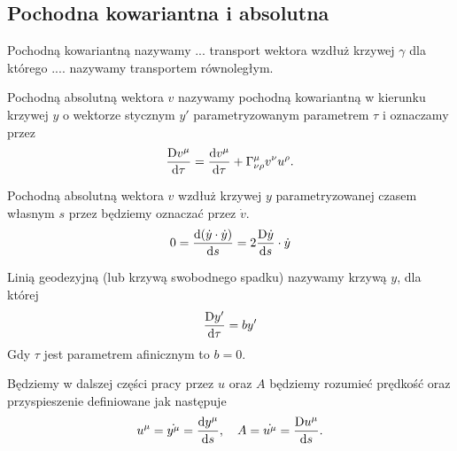 \subsection{Pochodna kowariantna i absolutna}
\begin{definition}
Pochodną kowariantną nazywamy ...
transport wektora wzdłuż krzywej $\gamma$ dla którego 
.... nazywamy transportem równoległym.
\end{definition}
\begin{definition}
Pochodną absolutną wektora $v$ nazywamy pochodną kowariantną w 
kierunku krzywej $y$ o wektorze stycznym $y'$ 
parametryzowanym parametrem $\tau$ i oznaczamy przez
\begin{align}
\frac{\text{D} v^\mu }{\text{d} \tau } = \frac{\text{d} v^\mu}{\text{d} \tau}
+ \Gamma^\mu_{\nu\rho} v^\nu u^\rho.
\end{align}
\end{definition}
Pochodną absolutną wektora $v$ wzdłuż krzywej $y$
parametryzowanej czasem własnym $s$
przez będziemy oznaczać przez $\dot{v}$. 
\begin{align}
0 = \frac{\text{d} (\dot{y} \cdot \dot{y}) }{\text{d} s} = 
2 \frac{\text{D} \dot{y}}{\text{d} s} \cdot \dot{y}
\end{align}
\begin{definition}
Linią geodezyjną (lub krzywą swobodnego spadku) nazywamy krzywą $y$, dla której
\begin{align}
\frac{\text{D} y'}{\text{d} \tau } = b y'
\end{align} 
Gdy $\tau$ jest parametrem afinicznym to $b=0$.
\end{definition}
Będziemy w dalszej części pracy przez $u$ oraz $A$ będziemy rozumieć 
prędkość oraz przyspieszenie definiowane jak następuje
\begin{align}
u^\mu = \dot{y^\mu} = \frac{\text{d} y^\mu}{\text{d} s}, 
\quad A = \dot{u^\mu} =  \frac{\text{D} u^\mu}{\text{d} s}.
\end{align}




